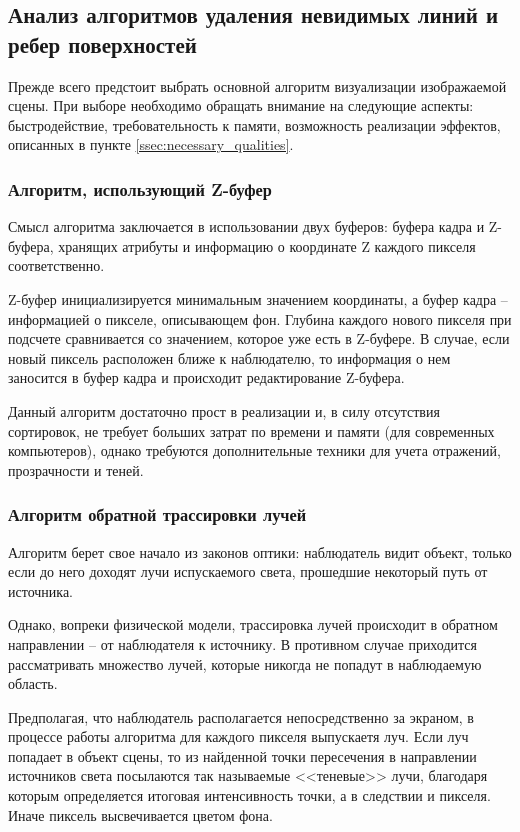 \subsection{Анализ алгоритмов удаления невидимых линий и ребер поверхностей}
Прежде всего предстоит выбрать основной алгоритм визуализации изображаемой
сцены. При выборе необходимо обращать внимание на следующие аспекты:
быстродействие, требовательность к памяти, возможность реализации эффектов,
описанных в пункте \ref{ssec:necessary_qualities}.

\subsubsection{Алгоритм, использующий Z-буфер}
Смысл алгоритма заключается в использовании двух буферов: буфера кадра и
Z-буфера, хранящих атрибуты и информацию о координате Z каждого пикселя
соответственно.

Z-буфер инициализируется минимальным значением координаты, а буфер
кадра -- информацией о пикселе, описывающем фон. Глубина каждого нового
пикселя при подсчете сравнивается со значением, которое уже есть в Z-буфере. В
случае, если новый пиксель расположен ближе к наблюдателю, то информация о
нем заносится в буфер кадра и происходит редактирование Z-буфера.

Данный алгоритм достаточно прост в реализации и, в силу отсутствия
сортировок, не требует больших затрат по времени и памяти (для современных
компьютеров), однако требуются дополнительные техники для учета отражений,
прозрачности и теней.

\subsubsection{Алгоритм обратной трассировки лучей}
Алгоритм берет свое начало из законов оптики: наблюдатель видит объект,
только если до него доходят лучи испускаемого света, прошедшие некоторый путь
от источника.

Однако, вопреки физической модели, трассировка лучей происходит в
обратном направлении -- от наблюдателя к источнику. В противном случае
приходится рассматривать множество лучей, которые никогда не попадут в
наблюдаемую область.

Предполагая, что наблюдатель располагается непосредственно за экраном,
в процессе работы алгоритма для каждого пикселя выпускаетя луч. Если луч
попадает в объект сцены, то из найденной точки пересечения в направлении
источников света посылаются так называемые <<теневые>> лучи, благодаря которым
определяется итоговая интенсивность точки, а в следствии и пикселя. Иначе
пиксель высвечивается цветом фона.

